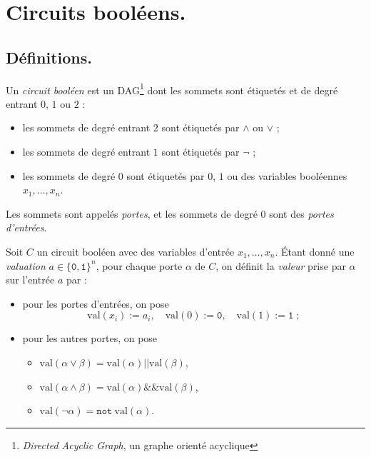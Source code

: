 \documentclass[./main]{subfiles}
\begin{document}
  \chapter{Circuits booléens.}

  \section{Définitions.}

  \begin{defn}
    Un \textit{circuit booléen} est un DAG\footnote{\textit{Directed Acyclic Graph}, un graphe orienté acyclique} dont les sommets sont étiquetés et de degré entrant $0$, $1$ ou $2$ :
    \begin{itemize}
      \item les sommets de degré entrant $2$ sont étiquetés par $\wedge$ ou $\vee$ ;
      \item les sommets de degré entrant $1$ sont étiquetés par $\lnot$ ;
      \item les sommets de degré $0$ sont étiquetés par $0$, $1$ ou des variables booléennes $x_1, \ldots, x_n$.
    \end{itemize}
    Les sommets sont appelés \textit{portes}, et les sommets de degré $0$ sont des  \textit{portes d'entrées}.
  \end{defn}

  \begin{defn}
    Soit $C$ un circuit booléen avec des variables d'entrée $x_1, \ldots, x_n$.
    Étant donné une \textit{valuation} $a \in \{\texttt{0}, \texttt{1}\}^n$, pour chaque porte $\alpha$ de $C$, on définit la \textit{valeur} prise par $\alpha$ sur l'entrée $a$ par :
    \begin{itemize}
      \item pour les portes d'entrées, on pose  \[
        \mathrm{val}(x_i) := a_i, \quad \mathrm{val}(0) := \texttt{0}, \quad \mathrm{val}(1) := \texttt{1}\;
        ;\]
      \item pour les autres portes, on pose
        \begin{itemize}
          \item $\mathrm{val}(\alpha \vee \beta) = \mathrm{val}(\alpha) \mathbin{\texttt{||}} \mathrm{val}(\beta)$,
          \item $\mathrm{val}(\alpha \wedge \beta) = \mathrm{val}(\alpha) \mathbin{\texttt{\&\&}} \mathrm{val}(\beta)$,
          \item $\mathrm{val}(\lnot \alpha) = \texttt{not}\: \mathrm{val}(\alpha)$.
        \end{itemize}
    \end{itemize}
  \end{defn}
\end{document}
